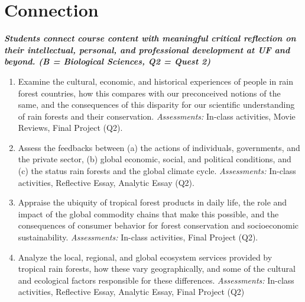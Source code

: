 \documentclass[
  12pt,
  letterpaper,
  DIV=11,
  numbers=noendperiod]{scrreprt}
\begin{document}
\section*{Connection}\label{connection}

\textbf{\emph{Students connect course content with meaningful critical
reflection on their intellectual, personal, and professional development
at UF and beyond. (B = Biological Sciences, Q2 = Quest 2)}}

\begin{enumerate}
\def\labelenumi{(\arabic{enumi})}
\item
  Examine the cultural, economic, and historical experiences of people
  in rain forest countries, how this compares with our preconceived
  notions of the same, and the consequences of this disparity for our
  scientific understanding of rain forests and their conservation.
  \emph{Assessments:} In-class activities, Movie Reviews, Final Project
  (Q2).
\item
  Assess the feedbacks between (a) the actions of individuals,
  governments, and the private sector, (b) global economic, social, and
  political conditions, and (c) the status rain forests and the global
  climate cycle. \emph{Assessments:} In-class activities, Reflective
  Essay, Analytic Essay (Q2).
\item
  Appraise the ubiquity of tropical forest products in daily life, the
  role and impact of the global commodity chains that make this
  possible, and the consequences of consumer behavior for forest
  conservation and socioeconomic sustainability. \emph{Assessments:}
  In-class activities, Final Project (Q2).
\item
  Analyze the local, regional, and global ecosystem services provided by
  tropical rain forests, how these vary geographically, and some of the
  cultural and ecological factors responsible for these differences.
  \emph{Assessments:} In-class activities, Reflective Essay, Analytic
  Essay, Final Project (Q2)
\end{enumerate}
\end{document}
